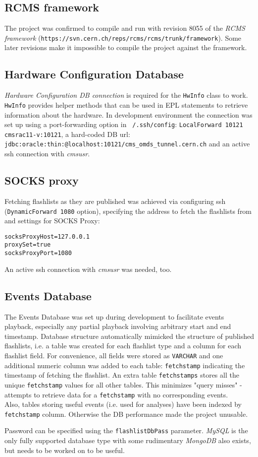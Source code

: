 \subsection{RCMS framework} \label{subsec:framework}
The project was confirmed to compile and run with revision 8055 of the \emph{RCMS framework} (\texttt{https://svn.cern.ch/reps/rcms/rcms/trunk/framework}). 
Some later revisions make it impossible to compile the project against the framework.

\subsection{Hardware Configuration Database}
\label{subsec:hwconfdb}
\emph{Hardware Configuration DB connection} is required for the \texttt{HwInfo} class to work. \texttt{HwInfo} provides helper methods that can be used in EPL statements to retrieve information about the hardware.
In development environment the connection was set up using a port-forwarding option in \texttt{~/.ssh/config}: \texttt{LocalForward 10121 cmsrac11-v:10121}, a hard-coded DB url: \texttt{jdbc:oracle:thin:@localhost:10121/cms\_omds\_tunnel.cern.ch} and an active ssh connection with \emph{cmsusr}.

\subsection{SOCKS proxy}
\label{subsec:proxy}
Fetching flashlists as they are published was achieved via configuring ssh (\texttt{DynamicForward 1080} option), specifying the address to fetch the flashlists from and settings for SOCKS Proxy:
\begin{lstlisting}
socksProxyHost=127.0.0.1
proxySet=true
socksProxyPort=1080
\end{lstlisting}
An active ssh connection with \emph{cmsusr} was needed, too.

\subsection{Events Database}
\label{subsec:eventsdb}
The Events Database was set up during development to facilitate events playback, especially any partial playback involving arbitrary start and end timestamp.
Database structure automatically mimicked the structure of published flashlists, i.e. a table was created for each flashlist type and a column for each flashlist field. 
For convenience, all fields were stored as \texttt{VARCHAR} and one additional numeric column was added to each table: \texttt{fetchstamp} indicating the timestamp of fetching the flashlist. An extra table \texttt{fetchstamps} stores all the unique \texttt{fetchstamp} values for all other tables. This minimizes "query misses" - attempts to retrieve data for a \texttt{fetchstamp} with no corresponding events. \\
Also, tables storing useful events (i.e. used for analyses) have been indexed by \texttt{fetchstamp} column. Otherwise the DB performance made the project unusable. 

Password can be specified using the \texttt{flashlistDbPass} parameter. \emph{MySQL} is the only fully supported database type with some rudimentary \emph{MongoDB} also exists, but needs to be worked on to be useful.






